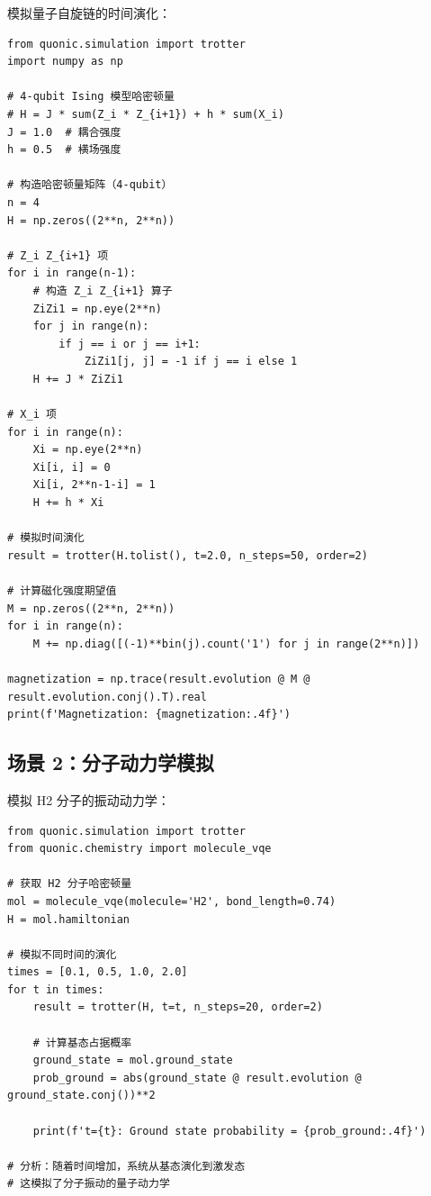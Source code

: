 \documentclass[12pt,a4paper]{article}
\begin{document}
模拟量子自旋链的时间演化：

\begin{verbatim}
from quonic.simulation import trotter
import numpy as np

# 4-qubit Ising 模型哈密顿量
# H = J * sum(Z_i * Z_{i+1}) + h * sum(X_i)
J = 1.0  # 耦合强度
h = 0.5  # 横场强度

# 构造哈密顿量矩阵（4-qubit）
n = 4
H = np.zeros((2**n, 2**n))

# Z_i Z_{i+1} 项
for i in range(n-1):
    # 构造 Z_i Z_{i+1} 算子
    ZiZi1 = np.eye(2**n)
    for j in range(n):
        if j == i or j == i+1:
            ZiZi1[j, j] = -1 if j == i else 1
    H += J * ZiZi1

# X_i 项
for i in range(n):
    Xi = np.eye(2**n)
    Xi[i, i] = 0
    Xi[i, 2**n-1-i] = 1
    H += h * Xi

# 模拟时间演化
result = trotter(H.tolist(), t=2.0, n_steps=50, order=2)

# 计算磁化强度期望值
M = np.zeros((2**n, 2**n))
for i in range(n):
    M += np.diag([(-1)**bin(j).count('1') for j in range(2**n)])

magnetization = np.trace(result.evolution @ M @ result.evolution.conj().T).real
print(f'Magnetization: {magnetization:.4f}')
\end{verbatim}

\subsection{场景 2：分子动力学模拟}

模拟 H2 分子的振动动力学：

\begin{verbatim}
from quonic.simulation import trotter
from quonic.chemistry import molecule_vqe

# 获取 H2 分子哈密顿量
mol = molecule_vqe(molecule='H2', bond_length=0.74)
H = mol.hamiltonian

# 模拟不同时间的演化
times = [0.1, 0.5, 1.0, 2.0]
for t in times:
    result = trotter(H, t=t, n_steps=20, order=2)

    # 计算基态占据概率
    ground_state = mol.ground_state
    prob_ground = abs(ground_state @ result.evolution @ ground_state.conj())**2

    print(f't={t}: Ground state probability = {prob_ground:.4f}')

# 分析：随着时间增加，系统从基态演化到激发态
# 这模拟了分子振动的量子动力学
\end{verbatim}
\end{document}
